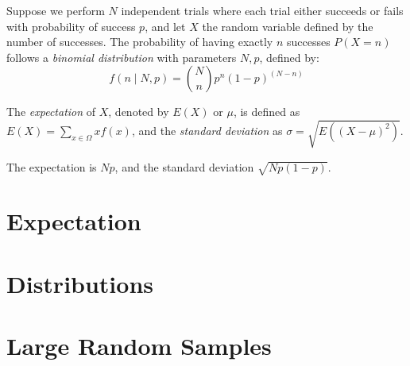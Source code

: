 \begin{example}
Suppose we perform $N$ independent trials where each trial either succeeds or fails with probability of success $p$, and let $X$ the random variable defined by the number of successes. The probability of having exactly $n$ successes $P(X=n)$ follows a \emph{binomial distribution} with parameters $N, p$, defined by:
\[
f(n\mid N, p) = \binom{N}{n} p^n (1-p)^{(N-n)}
\]
\end{example}

The \emph{expectation} of $X$, denoted by $E(X)$ or $\mu$, is defined as $E(X) = \sum_{x \in \Omega} x f(x)$, and the \emph{standard deviation} as $\sigma = \sqrt{E \left( (X - \mu)^2 \right)}$.

\begin{example}
The expectation is $Np$, and the standard deviation $\sqrt{Np(1-p)}$.
\end{example}

%
%

\section{Expectation}
\label{sec:probability_expectation}


%
%

\section{Distributions}
\label{sec:probability_distributions}


%
%

\section{Large Random Samples}
\label{sec:probability_random_samples}

